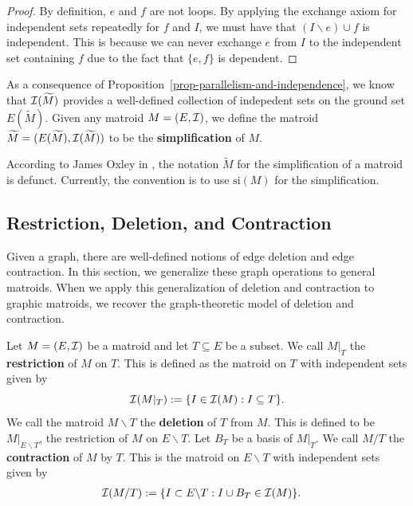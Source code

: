 \documentclass{puthesis-UG}
\begin{document}
\begin{proof}
	By definition, $e$ and $f$ are not loops. By applying the exchange axiom for independent sets repeatedly for $f$ and $I$, we must have that $(I \backslash e) \cup f$ is independent. This is because we can never exchange $e$ from $I$ to the independent set containing $f$ due to the fact that $\{e, f\}$ is dependent. 
\end{proof}

As a consequence of Proposition~\ref{prop-parallelism-and-independence}, we know that $\mathcal{I}(\widetilde{M})$ provides a well-defined collection of indepedent sets on the ground set $E(\widetilde{M})$. Given any matroid $M = (E, \mathcal{I})$, we define the matroid $\widetilde{M} = (E(\widetilde{M}), \mathcal{I}(\widetilde{M}))$ to be the \textbf{simplification} of $M$.

\begin{remark}
	According to James Oxley in \cite{10.5555/1197093}, the notation $\widetilde{M}$ for the simplification of a matroid is defunct. Currently, the convention is to use $\text{si}(M)$ for the simplification.  
\end{remark} 

\subsection{Restriction, Deletion, and Contraction} \label{sec:contraction-deletion}

Given a graph, there are well-defined notions of edge deletion and edge contraction. In this section, we generalize these graph operations to general matroids. When we apply this generalization of deletion and contraction to graphic matroids, we recover the graph-theoretic model of deletion and contraction. 

\begin{defn} \label{contraction-deletion}
	Let $M = (E, \mathcal{I})$ be a matroid and let $T \subseteq E$ be a subset. We call $M|_T$ the \textbf{restriction} of $M$ on $T$. This is defined as the matroid on $T$ with independent sets given by 
	\[
		\mathcal{I} (M|_T) := \{I \in \mathcal{I} (M) : I \subseteq T\}.
	\]
	We call the matroid $M \backslash T$ the \textbf{deletion} of $T$ from $M$. This is defined to be $M|_{E \backslash T}$, the restriction of $M$ on $E \backslash T$. Let $B_T$ be a basis of $M|_T$. We call $M / T$ the \textbf{contraction} of $M$ by $T$. This is the matroid on $E \backslash T$ with independent sets given by
	\begin{align*}
		\mathcal{I}(M/T) & := \{I \subset E \backslash T: I \cup B_T \in \mathcal{I}(M) \}.
	\end{align*}
\end{defn}
\end{document}
